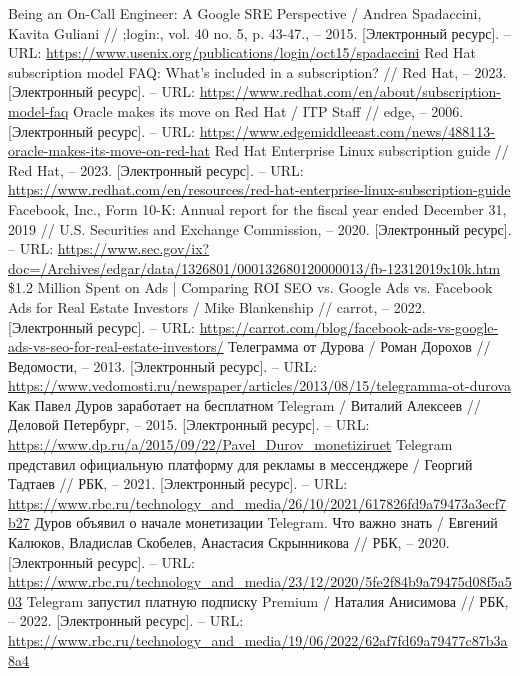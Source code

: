 \documentclass{article}
\begin{document}
\begin{thebibliography}{2}
 Being an On-Call Engineer: A Google SRE Perspective / Andrea Spadaccini, Kavita Guliani // ;login:, vol. 40 no. 5, p. 43-47., – 2015. [Электронный ресурс]. – URL: \url{https://www.usenix.org/publications/login/oct15/spadaccini}
 Red Hat subscription model FAQ: What's included in a subscription? // Red Hat, – 2023. [Электронный ресурс]. – URL: \url{https://www.redhat.com/en/about/subscription-model-faq}
 Oracle makes its move on Red Hat / ITP Staff // edge, – 2006. [Электронный ресурс]. – URL: \url{https://www.edgemiddleeast.com/news/488113-oracle-makes-its-move-on-red-hat}
 Red Hat Enterprise Linux subscription guide // Red Hat, – 2023. [Электронный ресурс]. – URL: \url{https://www.redhat.com/en/resources/red-hat-enterprise-linux-subscription-guide}
 Facebook, Inc., Form 10-K: Annual report for the fiscal year ended December 31, 2019 // U.S. Securities and Exchange Commission, – 2020. [Электронный ресурс]. – URL: \url{https://www.sec.gov/ix?doc=/Archives/edgar/data/1326801/000132680120000013/fb-12312019x10k.htm}
 \$1.2 Million Spent on Ads | Comparing ROI SEO vs. Google Ads vs. Facebook Ads for Real Estate Investors / Mike Blankenship // carrot, – 2022. [Электронный ресурс]. – URL: \url{https://carrot.com/blog/facebook-ads-vs-google-ads-vs-seo-for-real-estate-investors/}
 Телеграмма от Дурова / Роман Дорохов // Ведомости, – 2013. [Электронный ресурс]. – URL: \url{https://www.vedomosti.ru/newspaper/articles/2013/08/15/telegramma-ot-durova}
 Как Павел Дуров заработает на бесплатном Telegram / Виталий Алексеев // Деловой Петербург, – 2015. [Электронный ресурс]. – URL: \url{https://www.dp.ru/a/2015/09/22/Pavel\_Durov\_monetiziruet}
 Telegram представил официальную платформу для рекламы в мессенджере / Георгий Тадтаев // РБК, – 2021. [Электронный ресурс]. – URL: \url{https://www.rbc.ru/technology\_and\_media/26/10/2021/617826fd9a79473a3ecf7b27}
 Дуров объявил о начале монетизации Telegram. Что важно знать / Евгений Калюков, Владислав Скобелев, Анастасия Скрынникова // РБК, – 2020. [Электронный ресурс]. – URL: \url{https://www.rbc.ru/technology\_and\_media/23/12/2020/5fe2f84b9a79475d08f5a503}
 Telegram запустил платную подписку Premium / Наталия Анисимова // РБК, – 2022. [Электронный ресурс]. – URL: \url{https://www.rbc.ru/technology\_and\_media/19/06/2022/62af7fd69a79477c87b3a8a4}

\end{thebibliography}
\end{document}
